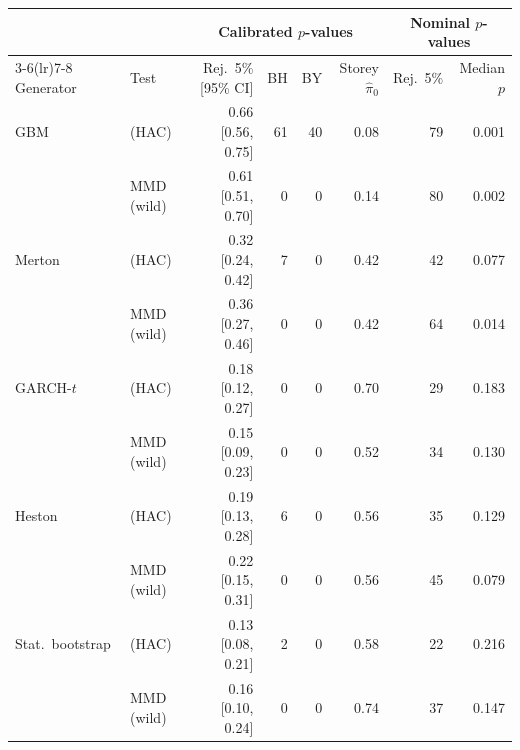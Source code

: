 \begin{tabular}{llrrrrrr}
\toprule
 & & \multicolumn{4}{c}{Calibrated $p$-values} & \multicolumn{2}{c}{Nominal $p$-values} \\
\cmidrule(lr){3-6}\cmidrule(lr){7-8}
Generator & Test & Rej.\ 5\% [95\% CI] & BH & BY & Storey $\hat\pi_0$ & Rej.\ 5\% & Median $p$ \\
\midrule
GBM & \WC{} (HAC) & 0.66 [0.56, 0.75] & 61 & 40 & 0.08 & 79 & 0.001 \\
 & MMD (wild) & 0.61 [0.51, 0.70] & 0 & 0 & 0.14 & 80 & 0.002 \\
\addlinespace
Merton & \WC{} (HAC) & 0.32 [0.24, 0.42] & 7 & 0 & 0.42 & 42 & 0.077 \\
 & MMD (wild) & 0.36 [0.27, 0.46] & 0 & 0 & 0.42 & 64 & 0.014 \\
\addlinespace
GARCH-$t$ & \WC{} (HAC) & 0.18 [0.12, 0.27] & 0 & 0 & 0.70 & 29 & 0.183 \\
 & MMD (wild) & 0.15 [0.09, 0.23] & 0 & 0 & 0.52 & 34 & 0.130 \\
\addlinespace
Heston & \WC{} (HAC) & 0.19 [0.13, 0.28] & 6 & 0 & 0.56 & 35 & 0.129 \\
 & MMD (wild) & 0.22 [0.15, 0.31] & 0 & 0 & 0.56 & 45 & 0.079 \\
\addlinespace
Stat.\ bootstrap & \WC{} (HAC) & 0.13 [0.08, 0.21] & 2 & 0 & 0.58 & 22 & 0.216 \\
 & MMD (wild) & 0.16 [0.10, 0.24] & 0 & 0 & 0.74 & 37 & 0.147 \\
\bottomrule
\end{tabular}
